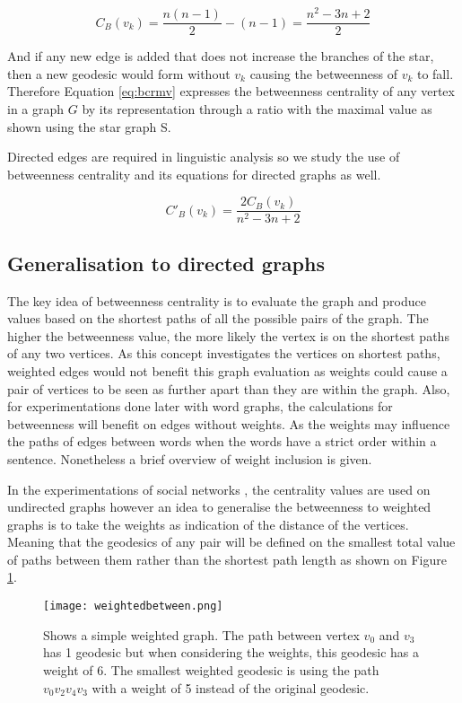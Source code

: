 \begin{equation}
C_B(v_k)= \frac{n(n-1)}{2} - (n-1) = \frac{n^2-3n+2}{2}
\end{equation}

And if any new edge is added that does not increase the branches of the star, then a new geodesic would form without $v_k$ causing the betweenness of $v_k$ to fall. Therefore Equation \ref{eq:bcrmv} expresses the betweenness centrality of any vertex in a graph $G$ by its representation through a ratio with the maximal value as shown using the star graph S.

Directed edges are required in linguistic analysis so we study the use of betweenness centrality and its equations for directed graphs as well.

\begin{equation}\label{eq:bcrmv}
C'_B(v_k)= \frac{2C_B(v_k)}{n^2-3n+2}
\end{equation}

\subsection{Generalisation to directed graphs}
The key idea of betweenness centrality is to evaluate the graph and produce values based on the shortest paths of all the possible pairs of the graph. The higher the betweenness value, the more likely the vertex is on the shortest paths of any two vertices. As this concept investigates the vertices on shortest paths, weighted edges would not benefit this graph evaluation as weights could cause a pair of vertices to be seen as further apart than they are within the graph. Also, for experimentations done later with word graphs, the calculations for betweenness will benefit on edges without weights. As the weights may influence the paths of edges between words when the words have a strict order within a sentence. Nonetheless a brief overview of weight inclusion is given.

In the experimentations of social networks \cite{freeman1979centrality}, the centrality values are used on undirected graphs however an idea to generalise the betweenness to weighted graphs is to take the weights as indication of the distance of the vertices. Meaning that the geodesics of any pair will be defined on the smallest total value of paths between them rather than the shortest path length as shown on Figure \ref{fig:dbc}.

\begin{figure}[!htb]
	\centering
	\texttt{[image: weightedbetween.png]}
	\caption{Shows a simple weighted graph. The path between vertex $v_0$ and $v_3$ has 1 geodesic but when considering the weights, this geodesic has a weight of 6. The smallest weighted geodesic is using the path $v_0v_2v_4v_3$ with a weight of 5 instead of the original geodesic. }
	\label{fig:dbc}
\end{figure}

